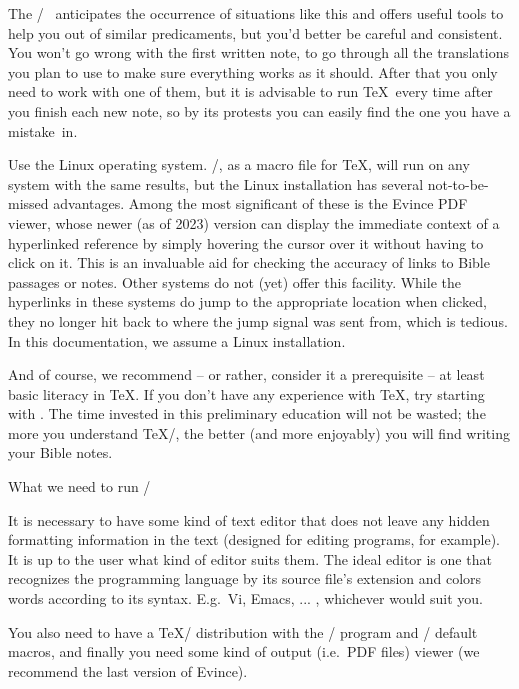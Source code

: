 {The \OpBible/~ anticipates the occurrence of situations like this and offers useful tools to help you out of similar predicaments, but you'd better be careful and consistent. You won't go wrong with the first written note, to go through all the translations you plan to use to make sure everything works as it should.  After that you only need to work with one of them, but it is advisable to run \TeX\ every time  after you finish each new note, so by its protests  you can easily find the one you have a mistake~in.

\recommended Use the Linux operating system. \OpBible/, as a macro file for \TeX, will run on any system with the same results, but the Linux installation has
several not-to-be-missed advantages. Among the most significant of these is the Evince PDF viewer, whose newer (as of 2023) version can display the immediate context of a hyperlinked
reference by simply hovering the cursor over it without having to click on it. This is an invaluable aid for checking the accuracy of links to Bible passages or notes.
Other systems do not (yet) offer this facility. While the hyperlinks in these systems do jump to the appropriate location when clicked, they no longer hit back to where the jump signal was sent from, which is tedious. In this documentation, we assume a Linux installation.

And of course, we recommend -- or rather, consider it a prerequisite -- at least basic literacy in \TeX.
If you don't have any experience with \TeX, try starting with 
. 
The time invested in this preliminary education will not be wasted; the more you understand \TeX/, the better (and more enjoyably) you will find writing your Bible notes.


\sec[Installation] What we need to run \OpBible/

It is necessary to have some kind of text editor that does not leave any hidden formatting information in the text (designed for editing programs, for example). It is up to the user what kind of editor suits them.
The ideal editor is one that recognizes the programming language by its source file's extension and colors words according to its syntax. E.g.\ Vi, Emacs, ... 
, whichever would suit you. 


You also need to have a \TeX/ distribution with the \LuaTeX/ program and \OpTeX/ default macros, and finally you need some kind of output (i.e.\ PDF files) viewer (we recommend the last version of Evince).

}
